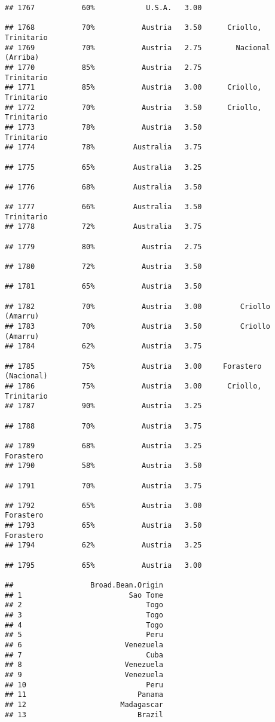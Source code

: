 \documentclass[
]{article}
\begin{document}
\begin{verbatim}
## 1767           60%            U.S.A.   3.00                         
## 1768           70%           Austria   3.50      Criollo, Trinitario
## 1769           70%           Austria   2.75        Nacional (Arriba)
## 1770           85%           Austria   2.75               Trinitario
## 1771           85%           Austria   3.00      Criollo, Trinitario
## 1772           70%           Austria   3.50      Criollo, Trinitario
## 1773           78%           Austria   3.50               Trinitario
## 1774           78%         Australia   3.75                         
## 1775           65%         Australia   3.25                         
## 1776           68%         Australia   3.50                         
## 1777           66%         Australia   3.50               Trinitario
## 1778           72%         Australia   3.75                         
## 1779           80%           Austria   2.75                         
## 1780           72%           Austria   3.50                         
## 1781           65%           Austria   3.50                         
## 1782           70%           Austria   3.00         Criollo (Amarru)
## 1783           70%           Austria   3.50         Criollo (Amarru)
## 1784           62%           Austria   3.75                         
## 1785           75%           Austria   3.00     Forastero (Nacional)
## 1786           75%           Austria   3.00      Criollo, Trinitario
## 1787           90%           Austria   3.25                         
## 1788           70%           Austria   3.75                         
## 1789           68%           Austria   3.25                Forastero
## 1790           58%           Austria   3.50                         
## 1791           70%           Austria   3.75                         
## 1792           65%           Austria   3.00                Forastero
## 1793           65%           Austria   3.50                Forastero
## 1794           62%           Austria   3.25                         
## 1795           65%           Austria   3.00                         
##                  Broad.Bean.Origin
## 1                         Sao Tome
## 2                             Togo
## 3                             Togo
## 4                             Togo
## 5                             Peru
## 6                        Venezuela
## 7                             Cuba
## 8                        Venezuela
## 9                        Venezuela
## 10                            Peru
## 11                          Panama
## 12                      Madagascar
## 13                          Brazil

\end{verbatim}
\end{document}
